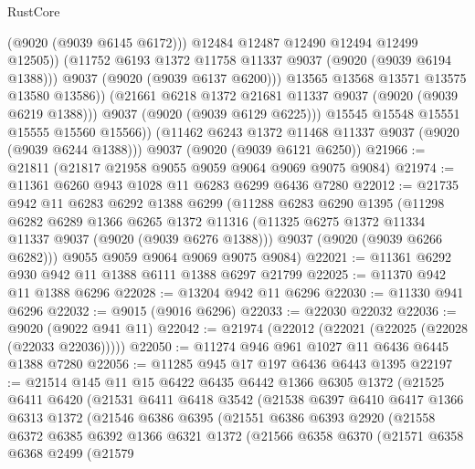 \begin{lexlean}{RustCore}
\begin{coremodule}
                      (@9020 (@9039 @6145 @6172)))
                    @12484
                    @12487
                    @12490
                    @12494
                    @12499
                    @12505))
                (@11752 @6193 @1372 @11758 @11337 @9037 (@9020 (@9039 @6194 @1388)))
                @9037
                (@9020 (@9039 @6137 @6200)))
              @13565
              @13568
              @13571
              @13575
              @13580
              @13586))
          (@21661 @6218 @1372 @21681 @11337 @9037 (@9020 (@9039 @6219 @1388)))
          @9037
          (@9020 (@9039 @6129 @6225)))
        @15545
        @15548
        @15551
        @15555
        @15560
        @15566))
    (@11462 @6243 @1372 @11468 @11337 @9037 (@9020 (@9039 @6244 @1388)))
    @9037
    (@9020 (@9039 @6121 @6250))
@21966 := @21811 (@21817 @21958 @9055 @9059 @9064 @9069 @9075 @9084)
@21974 := @11361 @6260 @943 @1028 @11 @6283 @6299 @6436 @7280
@22012 := @21735
    @942
    @11
    @6283
    @6292
    @1388
    @6299
    (@11288
      @6283
      @6290
      @1395
      (@11298
        @6282
        @6289
        @1366
        @6265
        @1372
        @11316
        (@11325 @6275 @1372 @11334 @11337 @9037 (@9020 (@9039 @6276 @1388)))
        @9037
        (@9020 (@9039 @6266 @6282)))
      @9055
      @9059
      @9064
      @9069
      @9075
      @9084)
@22021 := @11361 @6292 @930 @942 @11 @1388 @6111 @1388 @6297 @21799
@22025 := @11370 @942 @11 @1388 @6296
@22028 := @13204 @942 @11 @6296
@22030 := @11330 @941 @6296
@22032 := @9015 (@9016 @6296)
@22033 := @22030 @22032
@22036 := @9020 (@9022 @941 @11)
@22042 := @21974 (@22012 (@22021 (@22025 (@22028 (@22033 @22036)))))
@22050 := @11274 @946 @961 @1027 @11 @6436 @6445 @1388 @7280
@22056 := @11285 @945 @17 @197 @6436 @6443 @1395
@22197 := @21514
    @145
    @11
    @15
    @6422
    @6435
    @6442
    @1366
    @6305
    @1372
    (@21525
      @6411
      @6420
      (@21531
        @6411
        @6418
        @3542
        (@21538
          @6397
          @6410
          @6417
          @1366
          @6313
          @1372
          (@21546
            @6386
            @6395
            (@21551
              @6386
              @6393
              @2920
              (@21558
                @6372
                @6385
                @6392
                @1366
                @6321
                @1372
                (@21566
                  @6358
                  @6370
                  (@21571
                    @6358
                    @6368
                    @2499
                    (@21579

\end{coremodule}
\end{lexlean}
